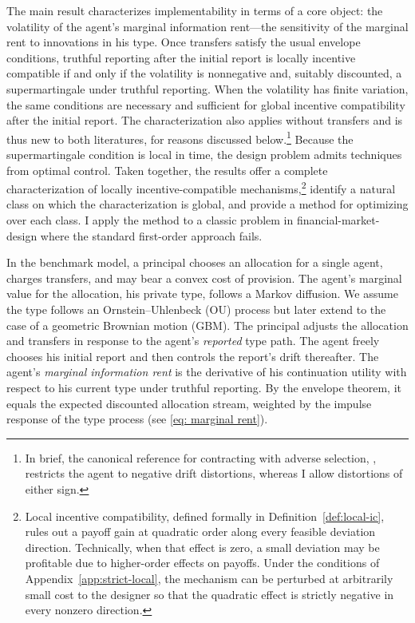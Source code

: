 \documentclass[12pt]{article}
\begin{document}
The main result characterizes implementability in terms of a core object: the
volatility of the agent's marginal information rent---the sensitivity of the marginal rent
to innovations in his type. Once transfers satisfy the usual envelope
conditions, truthful reporting after the initial report is locally
incentive compatible if and only if the volatility is nonnegative and,
suitably discounted, a supermartingale under truthful reporting. When
the volatility has finite variation, the same conditions are necessary
and sufficient for global incentive compatibility after the initial
report.  The characterization also applies without
transfers and is thus new to both literatures, for reasons discussed below.\footnote{In brief, the canonical reference for contracting with adverse selection,
\citet{williams2011persistent}, restricts the agent to negative drift
distortions, whereas I allow distortions of either sign.} Because the
supermartingale condition is local in time, the design problem admits techniques from optimal control. Taken together, the results offer a complete characterization of locally
incentive-compatible mechanisms,\footnote{Local incentive compatibility, defined formally in Definition~\ref{def:local-ic},
rules out a payoff gain at quadratic order along every feasible
deviation direction. Technically, when that effect is zero, a small deviation may be profitable due to higher-order effects on payoffs. Under the conditions of
Appendix~\ref{app:strict-local}, the mechanism can be perturbed at
arbitrarily small cost to the designer so that the quadratic effect is
strictly negative in every nonzero direction.} identify a
natural class on which the characterization is global, and provide a method for optimizing over each class. I apply
the method to a classic problem in financial-market-design where the standard
first-order approach fails.

In the benchmark model, a principal chooses an allocation for a single
agent, charges transfers, and may bear a convex cost of provision. The
agent's marginal value for the allocation, his private type, follows a Markov diffusion. We assume the type follows an Ornstein--Uhlenbeck (OU) process but later extend to the case of a geometric Brownian motion (GBM).
The principal adjusts the allocation and transfers in response to the agent's \emph{reported} type path. The agent freely chooses his initial report and then controls the report's drift thereafter. The agent's
\emph{marginal information rent} is
the derivative of his continuation utility with respect to his current type under truthful reporting. By the envelope theorem, it equals the expected
discounted allocation stream, weighted by the impulse response of the
type process (see \eqref{eq: marginal rent}).
\end{document}
